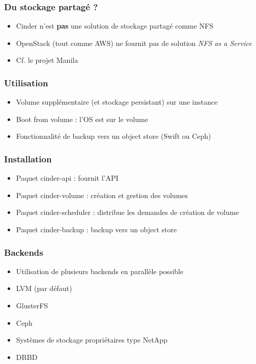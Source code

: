   \begin{frame}
    \frametitle{Du stockage partagé ?}
    \begin{itemize}
      \item Cinder n'est \textbf{pas} une solution de stockage partagé comme NFS
      \item OpenStack (tout comme AWS) ne fournit pas de solution \textit{NFS as a Service}
      \item Cf. le projet Manila
    \end{itemize}
  \end{frame}

  \begin{frame}
    \frametitle{Utilisation}
    \begin{itemize}
      \item Volume supplémentaire (et stockage persistant) sur une instance
      \item Boot from volume : l'OS est sur le volume
      \item Fonctionnalité de backup vers un object store (Swift ou Ceph)
    \end{itemize}
  \end{frame}

  \begin{frame}
    \frametitle{Installation}
    \begin{itemize}
      \item Paquet cinder-api : fournit l'API
      \item Paquet cinder-volume : création et gestion des volumes
      \item Paquet cinder-scheduler : distribue les demandes de création de volume
      \item Paquet cinder-backup : backup vers un object store
    \end{itemize}
  \end{frame}

  \begin{frame}
    \frametitle{Backends}
    \begin{itemize}
      \item Utilisation de plusieurs backends en parallèle possible
      \item LVM (par défaut)
      \item GlusterFS
      \item Ceph
      \item Systèmes de stockage propriétaires type NetApp
      \item DRBD
    \end{itemize}
  \end{frame}

